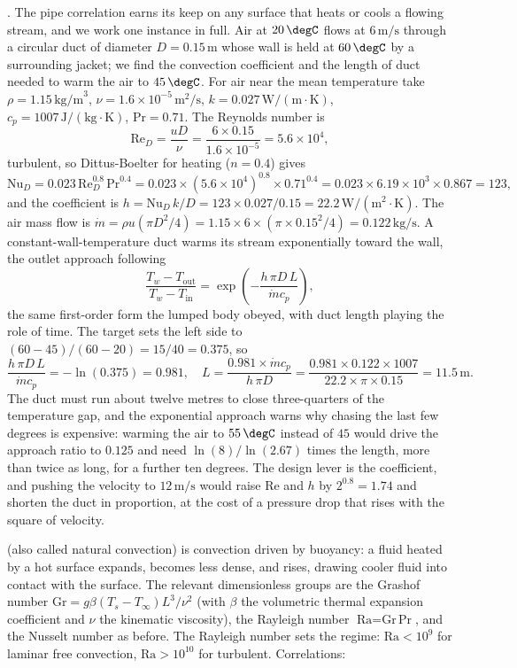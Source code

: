 . The pipe correlation earns its
keep on any surface that heats or cools a flowing stream, and we work one
instance in full. Air at $20\,\degC$ flows at $6\,\text{m/s}$ through a
circular duct of diameter $D = 0.15\,\text{m}$ whose wall is held at
$60\,\degC$ by a surrounding jacket; we find the convection coefficient and
the length of duct needed to warm the air to $45\,\degC$. For air near the
mean temperature take $\rho = 1.15\,\text{kg/m}^3$, $\nu = 1.6\times10^{-5}
\,\text{m}^2/\text{s}$, $k = 0.027\,\text{W}/(\text{m}\cdot\si{\kelvin})$,
$c_p = 1007\,\text{J}/(\text{kg}\cdot\si{\kelvin})$, $\text{Pr} = 0.71$. The
Reynolds number is
\[
\text{Re}_D = \frac{u D}{\nu} = \frac{6\times0.15}{1.6\times10^{-5}} =
5.6\times10^4,
\]
turbulent, so Dittus-Boelter for heating ($n = 0.4$) gives
\[
\text{Nu}_D = 0.023\,\text{Re}_D^{0.8}\,\text{Pr}^{0.4} = 0.023\times
(5.6\times10^4)^{0.8}\times0.71^{0.4} = 0.023\times6.19\times10^3\times
0.867 = 123,
\]
and the coefficient is $h = \text{Nu}_D\,k/D = 123\times0.027/0.15 =
22.2\,\text{W}/(\text{m}^2\cdot\si{\kelvin})$. The air mass flow is
$\dot{m} = \rho u (\pi D^2/4) = 1.15\times6\times(\pi\times0.15^2/4) =
0.122\,\text{kg/s}$. A constant-wall-temperature duct warms its stream
exponentially toward the wall, the outlet approach following
\[
\frac{T_w - T_{\text{out}}}{T_w - T_{\text{in}}} = \exp\!\left(-\frac{h\,
\pi D\,L}{\dot{m}c_p}\right),
\]
the same first-order form the lumped body obeyed, with duct length playing
the role of time. The target sets the left side to $(60-45)/(60-20) =
15/40 = 0.375$, so
\[
\frac{h\,\pi D\,L}{\dot{m}c_p} = -\ln(0.375) = 0.981, \quad L =
\frac{0.981\times\dot{m}c_p}{h\,\pi D} = \frac{0.981\times0.122\times1007}
{22.2\times\pi\times0.15} = 11.5\,\text{m}.
\]
The duct must run about twelve metres to close three-quarters of the
temperature gap, and the exponential approach warns why chasing the last
few degrees is expensive: warming the air to $55\,\degC$ instead of $45$
would drive the approach ratio to $0.125$ and need $\ln(8)/\ln(2.67)$
times the length, more than twice as long, for a further ten degrees. The
design lever is the coefficient, and pushing the velocity to $12\,\text{m/s}$
would raise $\text{Re}$ and $h$ by $2^{0.8} = 1.74$ and shorten the duct in
proportion, at the cost of a pressure drop that rises with the square of
velocity.

 (also called natural convection) is
convection driven by buoyancy: a fluid heated by a hot surface
expands, becomes less dense, and rises, drawing cooler fluid into
contact with the surface. The relevant dimensionless groups are the
Grashof number $\text{Gr} = g\beta(T_s - T_\infty)L^3/\nu^2$ (with
$\beta$ the volumetric thermal expansion coefficient and $\nu$ the
kinematic viscosity), the Rayleigh number $\text{Ra} = \text{Gr}\,
\text{Pr}$, and the Nusselt number as before. The Rayleigh number
sets the regime: $\text{Ra} < 10^9$ for laminar free convection,
$\text{Ra} > 10^{10}$ for turbulent. Correlations:

